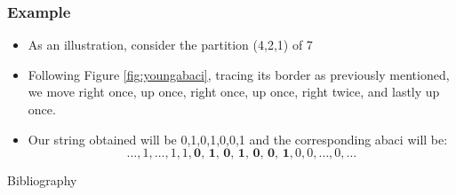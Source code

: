 \documentclass{beamer}
\begin{document}
\begin{frame}
\frametitle{Example}
\begin{itemize}
    \item As an illustration, consider the partition (4,2,1) of 7
    \item Following Figure \ref{fig:youngabaci}, tracing its border as previously mentioned, we move right once, up once, right once, up once, right twice, and lastly up once. 
    \item Our string obtained will be 0,1,0,1,0,0,1 and the corresponding abaci will be: \[ \ldots, 1, \ldots, 1, 1, \textbf{0, 1, 0, 1, 0, 0, 1}, 0, 0, \ldots, 0, \ldots \]
\end{itemize}
\centering
{}
\label{fig:youngabaci}
\end{frame}

\begin{frame}{Bibliography}
    

\end{frame}
\end{document}
